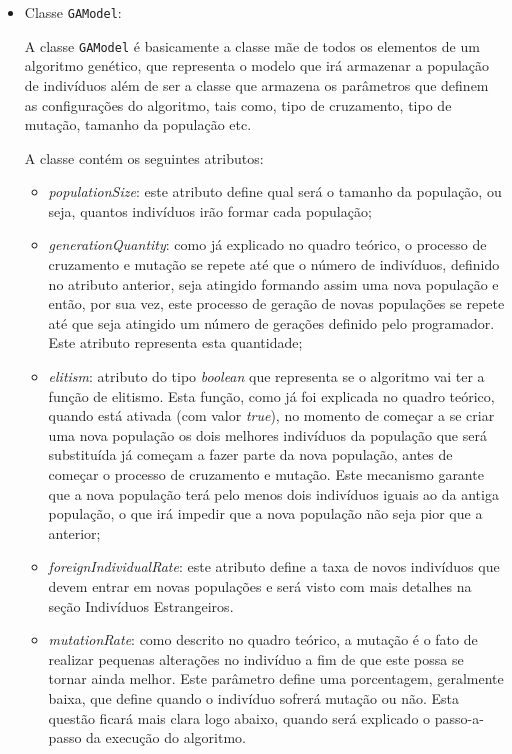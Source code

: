 \begin{itemize}
	
	\item Classe \texttt{GAModel}:
	\par A classe \texttt{GAModel} é basicamente a classe mãe de todos os elementos de um algoritmo genético, 
	que representa o modelo que irá armazenar a população de indivíduos além de ser
	a classe que armazena os parâmetros que definem as configurações do algoritmo, tais como, tipo de cruzamento, tipo de mutação, 
	tamanho da população etc.
	
	\par A classe contém os seguintes atributos:
	
	\begin{itemize} 
		\item \textit{populationSize}:
		este atributo define qual será o tamanho da população, ou seja, quantos
		indivíduos irão formar cada população;
		
		\item \textit{generationQuantity}:
		como já explicado no quadro teórico, o processo de cruzamento e mutação se
		repete até que o número de indivíduos, definido no atributo anterior, seja atingido formando assim uma nova população e então, por sua vez, 
		este processo de geração de novas populações se repete até que seja atingido um número de gerações definido 
		pelo programador. Este atributo representa esta quantidade;
		
		\item \textit{elitism}:
		atributo do tipo \textit{boolean} que representa se o algoritmo vai ter a
		função de elitismo.
		Esta função, como já foi explicada no quadro teórico, quando está ativada (com
		valor \textit{true}), no momento de começar a se criar uma nova população os dois melhores indivíduos da população que será 
		substituída já começam a fazer parte da nova população, antes de começar o processo de cruzamento e mutação. 
		Este mecanismo garante que a nova população terá pelo menos dois indivíduos iguais ao da antiga população, o que irá 
		impedir que a nova população não seja pior que a anterior;
		
		\item \textit{foreignIndividualRate}:
		este atributo define a taxa de novos indivíduos que devem entrar em novas
		populações e será visto com mais detalhes na seção Indivíduos Estrangeiros.
		
		\item \textit{mutationRate}:
		como descrito no quadro teórico, a mutação é o fato de realizar pequenas
		alterações no indivíduo a fim de que este possa se tornar ainda melhor. Este parâmetro define uma porcentagem, geralmente baixa, que define quando 
		o indivíduo sofrerá mutação ou não. Esta questão ficará mais clara logo
		abaixo, quando será explicado o passo-a-passo da execução do algoritmo.
		

\end{itemize}
\end{itemize}
